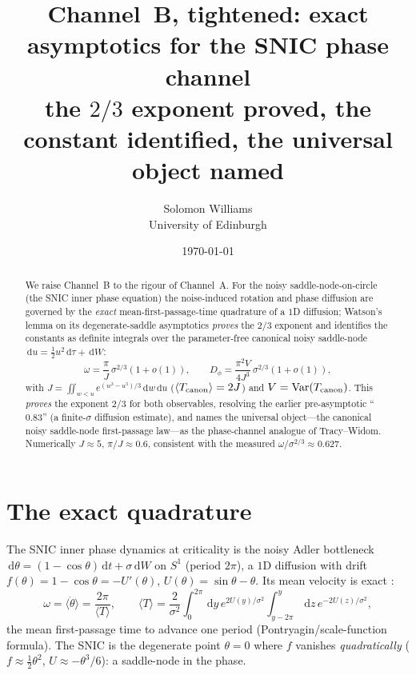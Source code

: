 \documentclass[11pt]{article}
\title{\textbf{Channel~B, tightened: exact asymptotics for the SNIC phase channel}\\[2pt]
\large the $2/3$ exponent proved, the constant identified, the universal object named}
\author{Solomon Williams \\ \small University of Edinburgh}
\date{\today}
\theoremstyle{remark}
\newcommand{\dd}{\,\mathrm{d}}
\DeclareMathOperator{\Var}{Var}
\begin{document}
\maketitle

\begin{abstract}\noindent
We raise Channel~B to the rigour of Channel~A. For the noisy saddle-node-on-circle (the
SNIC inner phase equation) the noise-induced rotation and phase diffusion are governed by
the \emph{exact} mean-first-passage-time quadrature of a $1$D diffusion; Watson's lemma on
its degenerate-saddle asymptotics \emph{proves} the $2/3$ exponent and identifies the
constants as definite integrals over the parameter-free canonical noisy saddle-node
$\dd u=\tfrac12 u^2\dd\tau+\dd W$:
\[
  \omega=\frac{\pi}{J}\,\sigma^{2/3}(1+o(1)),\qquad
  D_\phi=\frac{\pi^2 V}{4J^3}\,\sigma^{2/3}(1+o(1)),
\]
with $J=\iint_{w<u}e^{(w^3-u^3)/3}\dd w\dd u$ ($\langle T_{\rm canon}\rangle=2J$) and
$V=\Var(T_{\rm canon})$. This \emph{proves} the exponent $2/3$ for both observables,
resolving the earlier pre-asymptotic ``$0.83$'' (a finite-$\sigma$ diffusion estimate),
and names the universal object---the canonical noisy saddle-node first-passage law---as the
phase-channel analogue of Tracy--Widom. Numerically $J\approx5$, $\pi/J\approx0.6$,
consistent with the measured $\omega/\sigma^{2/3}\approx0.627$.
\end{abstract}

\section{The exact quadrature}

The SNIC inner phase dynamics at criticality is the noisy Adler bottleneck
$\dd\theta=(1-\cos\theta)\dd t+\sigma\dd W$ on $S^1$ (period $2\pi$), a $1$D diffusion with
drift $f(\theta)=1-\cos\theta=-U'(\theta)$, $U(\theta)=\sin\theta-\theta$. Its mean
velocity is exact \cite{Risken}:
\begin{equation}\label{eq:vel}
  \omega=\langle\dot\theta\rangle=\frac{2\pi}{\langle T\rangle},\qquad
  \langle T\rangle=\frac{2}{\sigma^2}\int_{0}^{2\pi}\!\!\dd y\,e^{2U(y)/\sigma^2}
       \int_{y-2\pi}^{y}\!\!\dd z\,e^{-2U(z)/\sigma^2},
\end{equation}
the mean first-passage time to advance one period (Pontryagin/scale-function formula). The
SNIC is the degenerate point $\theta=0$ where $f$ vanishes \emph{quadratically}
($f\approx\tfrac12\theta^2$, $U\approx-\theta^3/6$): a saddle-node in the phase.
\end{document}
